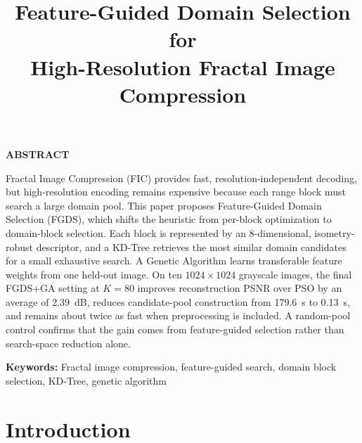 \documentclass[conference, a4paper]{IEEEtran}
\begin{document}
\title{\fontsize{14}{16}\selectfont\bfseries Feature-Guided Domain Selection for\\ High-Resolution Fractal Image Compression}

\author{
}

\maketitle

\begin{center}
    \textbf{ABSTRACT}
\end{center}
\noindent
Fractal Image Compression (FIC) provides fast, resolution-independent decoding, but high-resolution encoding remains expensive because each range block must search a large domain pool. This paper proposes Feature-Guided Domain Selection (FGDS), which shifts the heuristic from per-block optimization to domain-block selection. Each block is represented by an 8-dimensional, isometry-robust descriptor, and a KD-Tree retrieves the most similar domain candidates for a small exhaustive search. A Genetic Algorithm learns transferable feature weights from one held-out image. On ten \mbox{$1024\times1024$} grayscale images, the final FGDS+GA setting at \mbox{$K\!=\!80$} improves reconstruction PSNR over PSO by an average of 2.39~dB, reduces candidate-pool construction from 179.6~s to 0.13~s, and remains about twice as fast when preprocessing is included. A random-pool control confirms that the gain comes from feature-guided selection rather than search-space reduction alone.

\vspace{0.5\baselineskip}
\noindent
\textbf{Keywords:} Fractal image compression, feature-guided search, domain block selection, KD-Tree, genetic algorithm

\vspace{4mm}

\section{Introduction}
\end{document}
